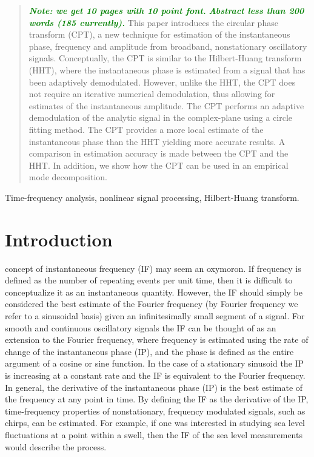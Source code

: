 \documentclass[a4paper]{IEEEtran}
\newcommand{\dean}[1]{\textsf{\emph{\textbf{\textcolor{green}{#1}}}}}
\begin{document}
\begin{abstract}
\dean{Note: we get 10 pages with 10 point font.} \dean{Abstract less than 200 words (185 currently).} This paper introduces the circular phase transform (CPT), a new technique for estimation of the instantaneous phase, frequency and amplitude from broadband, nonstationary oscillatory signals. Conceptually, the CPT is similar to the Hilbert-Huang transform (HHT), where the instantaneous phase is estimated from a signal that has been adaptively demodulated. However, unlike the HHT, the CPT does not require an iterative numerical demodulation, thus allowing for estimates of the instantaneous amplitude. The CPT performs an adaptive demodulation of the analytic signal in the complex-plane using a circle fitting method. The CPT provides a more local estimate of the instantaneous phase than the HHT yielding more accurate results. A comparison in estimation accuracy is made between the CPT and the HHT. In addition, we show how the CPT can be used in an empirical mode decomposition.
\end{abstract}


\begin{IEEEkeywords}
Time-frequency analysis, nonlinear signal processing, Hilbert-Huang transform.
\end{IEEEkeywords}

\IEEEpeerreviewmaketitle

\section{Introduction}
 concept of instantaneous frequency (IF) may seem an oxymoron. If frequency is defined as the number of repeating events per unit time, then it is difficult to conceptualize it as an instantaneous quantity. However, the IF should simply be considered the best estimate of the Fourier frequency (by Fourier frequency we refer to a sinusoidal basis) given an infinitesimally small segment of a signal. For smooth and continuous oscillatory signals the IF can be thought of as an extension to the Fourier frequency, where frequency is estimated using the rate of change of the instantaneous phase (IP), and the phase is defined as the entire argument of a cosine or sine function. In the case of a stationary sinusoid the IP is increasing at a constant rate and the IF is equivalent to the Fourier frequency. In general, the derivative of the instantaneous phase (IP) is the best estimate of the frequency at any point in time. By defining the IF as the derivative of the IP, time-frequency properties of nonstationary, frequency modulated signals, such as chirps, can be estimated. For example, if one was interested in studying sea level fluctuations at a point within a swell, then the IF of the sea level measurements would describe the process. 
\end{document}
